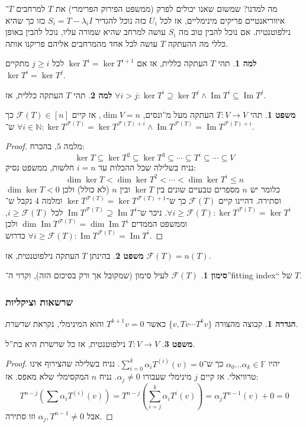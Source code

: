 \documentclass[a4paper]{article}
\newcommand\N     {\mathbb{N}}
\newcommand\fc    {\mathcal{F}}
\DeclareMathOperator\Img   {Im}
\newcommand\F         {\mathbb{F}}
\newcommand\co        {\colon}
\newcommand\ag        {\alpha}
\renewcommand\lg      {\lambda}
\newcommand\cl [1]    {\left ( #1 \right )}
\theoremstyle{definition}
\newtheorem{Theorem}{\color{myblue}משפט}
\newtheorem{Definition}{\color{mygreen}הגדרה}
\newtheorem{Lemma}{\color{myyellow}למה}
\newtheorem{Notion}{\color{myred}סימון}
\newcommand\theo  [1] {\begin{Theorem}#1\end{Theorem}}
\newcommand\defi  [1] {\begin{Definition}#1\end{Definition}}
\newcommand\lem   [1] {\begin{Lemma}#1\end{Lemma}}
\newcommand\noti  [1] {\begin{Notion}#1\end{Notion}}
\begin{document}
	מה למדנו? שמשום שאנו יכולים לפרק (ממשפט הפירוק הפרימרי) את $T$ למרחבים $T$־איווריאנטיים פריקים מינימליים, אז לכל $U_i$ כזה נוכל להגדיר $S_i = T - \lg_i I$ כזו כך שהיא נילפוטנטית. אם נוכל להבין טוב מה $S_i$ עושה למרחב שהיא שמורה עליו, נוכל להבין באופן כללי מה ההעתקה $T$ עושה לכל אחד מהמרחבים אליהם פריקנו אותה. 	
	
	\lem{תהי $T$ העתקה כללית, אז אם $\ker T^{i}  = \ker T^{i + 1}$ לכל $j \ge i$ מתקיים $\ker T^{i} = \ker T^{j}$. }
	\lem{תהי $T$ העתקה כללית, אז $\forall i > j \co \ker T^{i} \supseteq \ker T^{j} \land \Img T^{i} \subseteq \Img T^{j}$. }
	
	\theo{תהי $T \co V \to V$ העתקה מעל מ''ונסים, $\dim V = n$, אז קיים $\fc(T) \in [n]$ כך ש־
		$\forall i \in \N \co \ker T^{\fc(T)} = \ker T^{\fc(T) + i} \land \Img T^{\fc(T)} = \Img T^{\fc(T) + i}$. }
	\begin{proof}
		מלמה $5$, בהכרח: 
		\[ \ker T \subseteq \ker T^{2} \subseteq \ker T^{3} \subseteq \cdots \subseteq T^{i} \subseteq \cdots \subseteq V \]
		נניח בשלילה שכל ההכלות עד $i = n$ חלשות, ממשפט נסיק: 
		\[ \dim \ker T < \dim \ker T^{2} < \cdots < \dim \ker T^{i} \le n \]
		כלומר יש $n$ מספרים טבעיים שונים בין $\ker T$ ובין $n$ (לא כולל) ולכן $\dim \ker T < 0$ וסתירה. דהיינו קיים $\fc(T)$ כך ש־$\ker T^{\fc(T)} = \ker T^{\fc(T) + 1}$ ומלמה 4 נקבל ש־$\forall i \ge \fc(T) \co \ker T^{\fc(T)}  = \ker T^{i}$. ניכר ש־$\Img T^{\fc(T)} \supseteq \Img T^{i}$ לכל $i \ge \fc(T)$, וממשפט הממדים $\dim \Img T^{\fc(T)}  = \dim \Img T^{i}$ ולכן $\forall i \ge \fc(T) \co \Img T^{\fc(T)} = \Img T^{i}$ כדרוש. 
	\end{proof}
	\theo{בהינתן $T$ העתקה נילפוטנטית, אז $\fc(T) = n(T)$. }
	\noti{$\fc(T)$ לעיל סימון (שמקובל אך ורק בסיכום הזה), וקרוי ה־''fitting index`` של $T$. }
	
	
	\subsubsection{שרשאות וציקליות}
	
	\defi{קבוצה מהצורה $\{v, Tv \cdots T^kv\}$ כאשר $T^{k + 1}v = 0$ והוא המינימלי, נקראת \textit{שרשרת}. }
	
	\theo{$T \co V \to V$ נילפוטנטית, אז כל שרשרת היא בת''ל. }
	\begin{proof}
		יהיו $\ag_0 \dots \ag_k \in \F$ כך ש־$\sum_{i = 0}^{k}\ag_i T^{(i)}(v) = 0$. נניח בשלילה שהצירוף אינו טרוויאלי. אז קיים $j$ מינימלי שעבורו $\ag_j \neq 0$. נניח $n$ המקסימלי שלא מאפס. אז: 
		\[ T^{n - j}\cl{\sum \ag_i T^{(i)}(v)} = T^{n - j}\cl{\sum_{i = j}^{k}\ag_iT^{i}(v)} = \ag_jT^{n - 1}(v) + 0 = 0 \]
		אבל $\ag_j, T^{n - 1} \neq 0$ וזו סתירה. 
	\end{proof}
	
\end{document}
